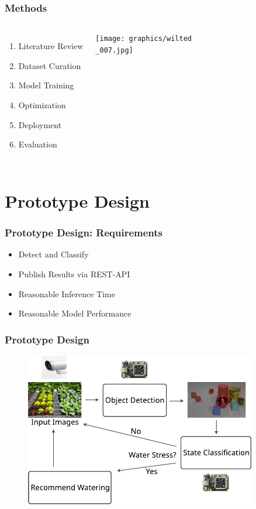 \documentclass{beamer}
\begin{document}
\begin{frame}
  \frametitle{Methods}
  \begin{columns}[c]
    \begin{enumerate}
      \setlength{\itemsep}{1.1\baselineskip}
    \item Literature Review
    \item Dataset Curation
    \item Model Training
    \item Optimization
    \item Deployment
    \item Evaluation
    \end{enumerate}
    \begin{center}
      \texttt{[image: graphics/wilted\\\_007.jpg]}
    \end{center}
  \end{columns}
\end{frame}

\section{Prototype Design}

\begin{frame}
  \frametitle{Prototype Design: Requirements} \pause
  \begin{itemize}
    \setlength{\itemsep}{1.1\baselineskip}
  \item Detect and Classify \pause
  \item Publish Results via REST-API \pause
  \item Reasonable Inference Time \pause
  \item Reasonable Model Performance
  \end{itemize}
\end{frame}

\begin{frame}
  \frametitle{Prototype Design}
  \begin{figure}[htbp]
    \centerline{\includegraphics[width=0.9\textwidth]{graphics/setup.pdf}}
    \label{fig:design}
  \end{figure}
\end{frame}
\end{document}
